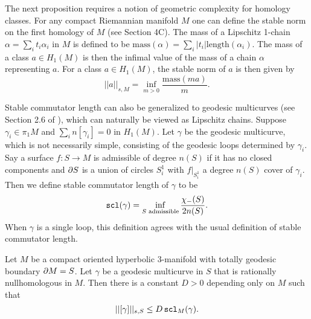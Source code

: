 The next proposition requires a notion of geometric complexity for homology classes. For any compact Riemannian manifold $M$ one can define the stable norm on the first homology of $M$ (see \cite{Gromovmetric} Section 4C). The mass of a Lipschitz 1-chain $\alpha = \sum_i t_i\alpha_i$ in $M$ is defined to be $\text{mass}(\alpha) = \sum_i |t_i|\text{length}(\alpha_i).$ The mass of a class $a\in H_1(M)$ is then the infimal value of the mass of a chain $\alpha$ representing $a$.
For a class $a\in H_1(M)$, the stable norm of $a$ is then given by $$||a||_{s,M} = \inf\limits_{m>0}\frac{\text{mass}(m a)}{m}.$$

Stable commutator length can also be generalized to geodesic multicurves (see Section 2.6 of \cite{Calegari}), which can naturally be viewed as Lipschitz chains. Suppose $\gamma_i\in \pi_1 M$ and $ \sum_i n [\gamma_i] = 0$ in $H_1(M)$. Let $\gamma$ be the geodesic multicurve, which is not necessarily simple, consisting of the geodesic loops determined by $\gamma_i$. Say a surface $f:S\to M$ is admissible of degree $n(S)$ if it has no closed components and $\partial S$ is a union of circles $S^1_i$ with $f|_{S^1_i}$ a degree $n(S)$ cover of $\gamma_i$.
Then we define stable commutator length of $\gamma$ to be $$\operatorname{{\tt{scl}}}(\gamma) = \inf\limits_{S \text{ admissible}} \frac{\chi_-(S)}{2n(S)}.$$ When $\gamma$ is a single loop, this definition agrees with the usual definition of stable commutator length.

 \begin{prop} \label{prop:6.2} Let $M$ be a compact oriented hyperbolic 3-manifold with totally geodesic boundary $\partial M = S$. Let $\gamma$ be a geodesic multicurve in $S$ that is rationally nullhomologous in $M$. Then there is a constant $D> 0$ depending only on $M$ such that $$||[\gamma]||_{s,S}\leq D\operatorname{{\tt{scl}}}_M(\gamma).$$ \end{prop}

